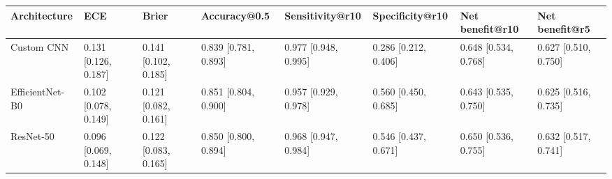 \begin{tabular}{llllllll}
\toprule
Architecture & ECE & Brier & Accuracy@0.5 & Sensitivity@r10 & Specificity@r10 & Net benefit@r10 & Net benefit@r5 \\
\midrule
Custom CNN & 0.131 [0.126, 0.187] & 0.141 [0.102, 0.185] & 0.839 [0.781, 0.893] & 0.977 [0.948, 0.995] & 0.286 [0.212, 0.406] & 0.648 [0.534, 0.768] & 0.627 [0.510, 0.750] \\
EfficientNet-B0 & 0.102 [0.078, 0.149] & 0.121 [0.082, 0.161] & 0.851 [0.804, 0.900] & 0.957 [0.929, 0.978] & 0.560 [0.450, 0.685] & 0.643 [0.535, 0.750] & 0.625 [0.516, 0.735] \\
ResNet-50 & 0.096 [0.069, 0.148] & 0.122 [0.083, 0.165] & 0.850 [0.800, 0.894] & 0.968 [0.947, 0.984] & 0.546 [0.437, 0.671] & 0.650 [0.536, 0.755] & 0.632 [0.517, 0.741] \\
\bottomrule
\end{tabular}
